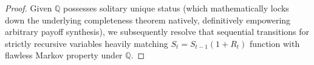 \begin{proof}
    Given $\mathbb{Q}$ possesses solitary unique status (which mathematically locks down the underlying completeness theorem natively, definitively empowering arbitrary payoff synthesis), we subsequently resolve that sequential transitions for strictly recursive variables heavily matching $S_t = S_{t-1}(1+R_t)$ function with flawless Markov property under $\mathbb{Q}$.
\end{proof}
